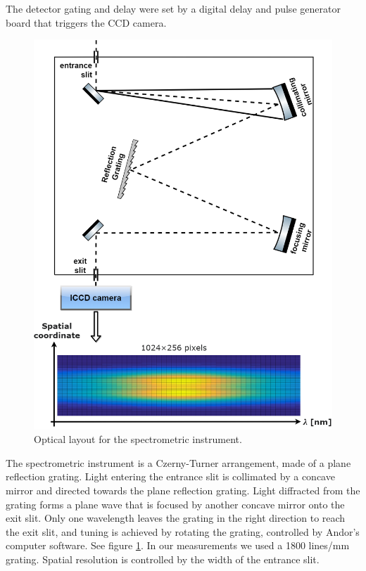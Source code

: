 \documentclass[justified,nofonts,nobib]{tufte-book}
\begin{document}
The detector gating and delay were set by a digital delay and pulse generator board that triggers the CCD camera.

\begin{figure}
\centering
\includegraphics[width=\textwidth]{./figures/spectro/spectrometer.PNG}
\caption{Optical layout for the spectrometric instrument.}
\label{fig:spectrometer}
\end{figure}
The spectrometric instrument is a Czerny-Turner arrangement, made of a plane reflection grating. Light entering the entrance slit is collimated by a concave mirror and directed towards the plane reflection grating. Light diffracted from the grating forms a plane wave that is focused by another concave mirror onto the exit slit. Only one wavelength leaves the grating in the right direction to reach the exit slit, and tuning is achieved by rotating the grating, controlled by Andor's computer software. See figure \ref{fig:spectrometer}. In our measurements we used a 1800 lines/mm grating. Spatial resolution is controlled by the width of the entrance slit.
\end{document}
